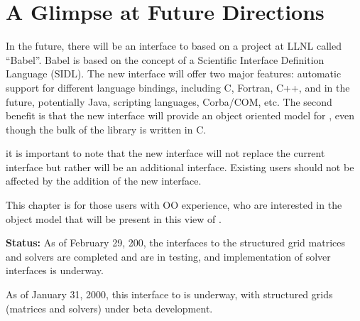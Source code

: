 
\chapter{A Glimpse at Future Directions}

In the future, there will be an interface to \hypre{} based on
a project at LLNL called ``Babel''. 
Babel is based on the concept of a Scientific Interface
Definition Language (SIDL).
The new interface will offer two major features:
automatic support for different language bindings, including
C, Fortran, C++, and in the future, potentially Java, scripting
languages, Corba/COM, etc.
The second benefit is that the new interface will provide an
object oriented model for \hypre{}, even though the bulk of
the library is written in C.

it is important to note that the new interface will not replace
the current interface but rather will be an additional interface.
Existing users should not be affected by the addition of the new
interface.

This chapter is for those users with OO experience, who are interested
in the object model that will be present in this view of \hypre{}.

{\bf Status:} As of February 29, 200, the interfaces to the structured
grid matrices and solvers are completed and are in testing, and implementation
of solver interfaces is underway. 

As of January 31, 2000, this interface to \hypre{}
is underway, with structured grids (matrices and solvers) under
beta development.
